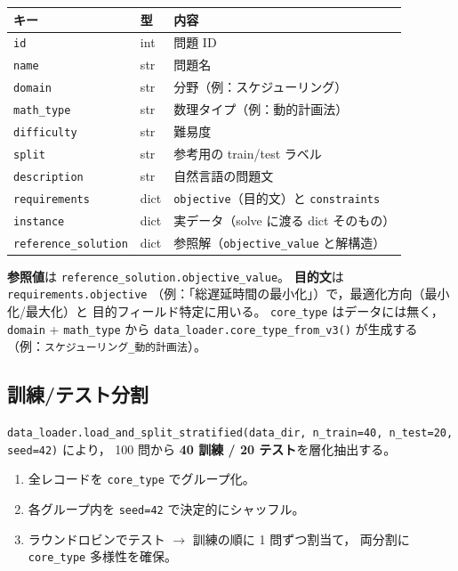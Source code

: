 \documentclass[uplatex,dvipdfmx,a4paper,11pt]{jsarticle}
\begin{document}
\begin{center}
\begin{tabular}{lll}
  \toprule
  キー & 型 & 内容 \\
  \midrule
  \texttt{id} & int & 問題 ID \\
  \texttt{name} & str & 問題名 \\
  \texttt{domain} & str & 分野（例：スケジューリング） \\
  \texttt{math\_type} & str & 数理タイプ（例：動的計画法） \\
  \texttt{difficulty} & str & 難易度 \\
  \texttt{split} & str & 参考用の train/test ラベル \\
  \texttt{description} & str & 自然言語の問題文 \\
  \texttt{requirements} & dict & \texttt{objective}（目的文）と \texttt{constraints} \\
  \texttt{instance} & dict & 実データ（solve に渡る dict そのもの） \\
  \texttt{reference\_solution} & dict & 参照解（\texttt{objective\_value} と解構造） \\
  \bottomrule
\end{tabular}
\end{center}

\textbf{参照値}は \texttt{reference\_solution.objective\_value}。
\textbf{目的文}は \texttt{requirements.objective}
（例：「総遅延時間の最小化」）で，最適化方向（最小化/最大化）と
目的フィールド特定に用いる。
\texttt{core\_type} はデータには無く，
\texttt{domain} + \texttt{math\_type} から
\texttt{data\_loader.core\_type\_from\_v3()} が生成する
（例：\texttt{スケジューリング\_動的計画法}）。

\subsection{訓練/テスト分割}

\texttt{data\_loader.load\_and\_split\_stratified(data\_dir,
n\_train=40, n\_test=20, seed=42)} により，
100 問から \textbf{40 訓練 / 20 テスト}を層化抽出する。

\begin{enumerate}
  \item 全レコードを \texttt{core\_type} でグループ化。
  \item 各グループ内を \texttt{seed=42} で決定的にシャッフル。
  \item ラウンドロビンでテスト $\to$ 訓練の順に 1 問ずつ割当て，
    両分割に \texttt{core\_type} 多様性を確保。
\end{enumerate}
\end{document}
